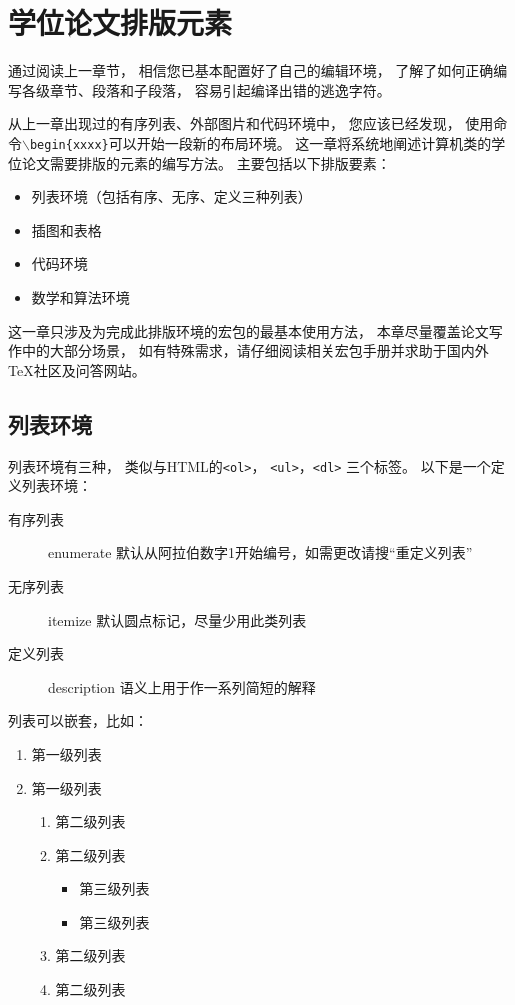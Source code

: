 
\chapter{学位论文排版元素}

通过阅读上一章节，
相信您已基本配置好了自己的编辑环境，
了解了如何正确编写各级章节、段落和子段落，
容易引起编译出错的逃逸字符。

从上一章出现过的有序列表、外部图片和代码环境中，
您应该已经发现，
使用命令\texttt{$\backslash$begin\{xxxx\}}可以开始一段新的布局环境。
这一章将系统地阐述计算机类的学位论文需要排版的元素的编写方法。
主要包括以下排版要素：
\begin{itemize}
    \item 列表环境（包括有序、无序、定义三种列表）
    \item 插图和表格
    \item 代码环境
    \item 数学和算法环境
\end{itemize}

这一章只涉及为完成此排版环境的宏包的最基本使用方法，
本章尽量覆盖论文写作中的大部分场景，
如有特殊需求，请仔细阅读相关宏包手册并求助于国内外TeX社区及问答网站。

\section{列表环境}

列表环境有三种，
类似与HTML的\texttt{<ol>}，
\texttt{<ul>}，\texttt{<dl>}
三个标签。
以下是一个定义列表环境：
\begin{description}
    \item[有序列表] enumerate 默认从阿拉伯数字1开始编号，如需更改请搜“重定义列表”
    \item[无序列表] itemize 默认圆点标记，尽量少用此类列表
    \item[定义列表] description 语义上用于作一系列简短的解释
\end{description}

列表可以嵌套，比如：
\begin{enumerate}
	\item 第一级列表
	\item 第一级列表
	\begin{enumerate}
		\item 第二级列表
		\item 第二级列表
        \begin{itemize}
            \item 第三级列表
            \item 第三级列表
		\end{itemize}
		\item 第二级列表
		\item 第二级列表
	\end{enumerate}
\end{enumerate}

